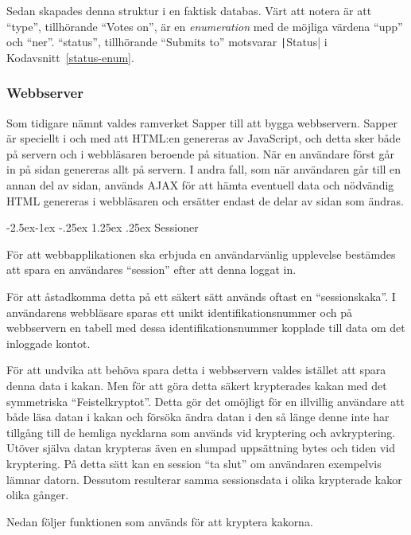 \documentclass{article}
\makeatletter
\renewcommand*\listingscaption{Kodavsnitt}
\newcommand*\coderef[1]{\listingscaption~\ref{#1}}
\renewcommand*\paragraph{\@startsection{paragraph}{4}{\z@}%
			{-2.5ex\@plus -1ex \@minus -.25ex}%
			{1.25ex \@plus .25ex}%
			{\normalfont\normalsize\bfseries}}
\makeatother
\begin{document}
Sedan skapades denna struktur i en faktisk databas. Värt att notera är att
``type'', tillhörande ``Votes on'', är en \textit{enumeration} med de möjliga
värdena ``upp'' och ``ner''. ``status'', tillhörande ``Submits to'' motsvarar
\texttt|Status| i \coderef{status-enum}.

\subsubsection{Webbserver}
\label{webbserver}

Som tidigare nämnt valdes ramverket Sapper till att bygga webbservern. Sapper är
speciellt i och med att HTML:en genereras av JavaScript, och detta sker både på
servern och i webbläsaren beroende på situation. När en användare först går in
på sidan genereras allt på servern. I andra fall, som när användaren går till en
annan del av sidan, används AJAX för att hämta eventuell data och nödvändig HTML
genereras i webbläsaren och ersätter endast de delar av sidan som ändras.

\paragraph{Sessioner}

För att webbapplikationen ska erbjuda en användarvänlig upplevelse bestämdes att
spara en användares ``session'' efter att denna loggat in.

För att åstadkomma detta på ett säkert sätt används oftast en ``sessionskaka''.
I användarens webbläsare sparas ett unikt identifikationsnummer och på
webbservern en tabell med dessa identifikationsnummer kopplade till data om det
inloggade kontot.


För att undvika att behöva spara detta i webbservern valdes istället att spara
denna data i kakan. Men för att göra detta säkert krypterades kakan med det
symmetriska ``Feistelkryptot''. Detta gör det omöjligt för en illvillig
användare att både läsa datan i kakan och försöka ändra datan i den så länge
denne inte har tillgång till de hemliga nycklarna som används vid kryptering och
avkryptering. Utöver själva datan krypteras även en slumpad uppsättning bytes
och tiden vid kryptering. På detta sätt kan en session ``ta slut'' om användaren
exempelvis lämnar datorn. Dessutom resulterar samma sessionsdata i olika
krypterade kakor olika gånger.

Nedan följer funktionen som används för att kryptera kakorna.
\end{document}
